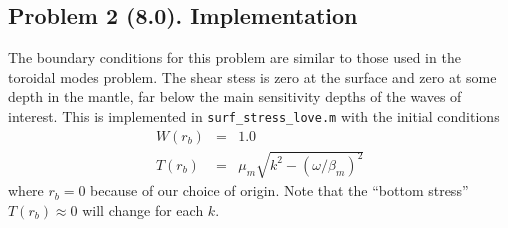 \documentclass[11pt,titlepage,fleqn]{article}
\begin{document}

\subsection*{Problem 2 (8.0). Implementation}

The boundary conditions for this problem are similar to those used in the toroidal modes problem. The shear stess is zero at the surface and zero at some depth in the mantle, far below the main sensitivity depths of the waves of interest. This is implemented in \verb+surf_stress_love.m+ with the initial conditions
%
\begin{eqnarray}
W(r_b) &=& 1.0
\label{Wbase}
\\
T(r_b) &=& \mu_m \sqrt{k^2 - (\omega/\beta_m)^2}
\label{Tbase}
\end{eqnarray}
%
where $r_b = 0$ because of our choice of origin. Note that the ``bottom stress'' $T(r_b) \approx 0$ will change for each $k$.
%
%

\end{document}
